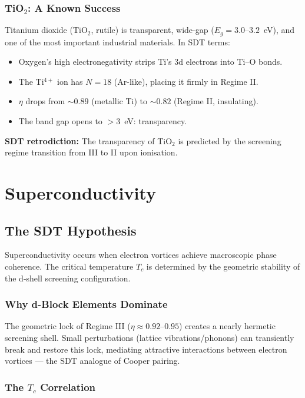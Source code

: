 \documentclass[12pt,a4paper]{report}
\begin{document}
\subsection{TiO$_2$: A Known Success}

Titanium dioxide (TiO$_2$, rutile) is transparent, wide-gap ($E_g = 3.0$--$3.2$~eV), and one of the most important industrial materials. In SDT terms:
\begin{itemize}
  \item Oxygen's high electronegativity strips Ti's 3d electrons into Ti--O bonds.
  \item The Ti$^{4+}$ ion has $N = 18$ (Ar-like), placing it firmly in Regime II.
  \item $\eta$ drops from $\sim 0.89$ (metallic Ti) to $\sim 0.82$ (Regime II, insulating).
  \item The band gap opens to $>3$~eV: transparency.
\end{itemize}

\textbf{SDT retrodiction:} The transparency of TiO$_2$ is predicted by the screening regime transition from III to II upon ionisation.


\chapter{Superconductivity}
\label{ch:superconductivity}

\section{The SDT Hypothesis}

Superconductivity occurs when electron vortices achieve macroscopic phase coherence. The critical temperature $T_c$ is determined by the geometric stability of the d-shell screening configuration.

\subsection{Why d-Block Elements Dominate}

The geometric lock of Regime III ($\eta \approx 0.92$--$0.95$) creates a nearly hermetic screening shell. Small perturbations (lattice vibrations/phonons) can transiently break and restore this lock, mediating attractive interactions between electron vortices --- the SDT analogue of Cooper pairing.

\subsection{The $T_c$ Correlation}
\end{document}

